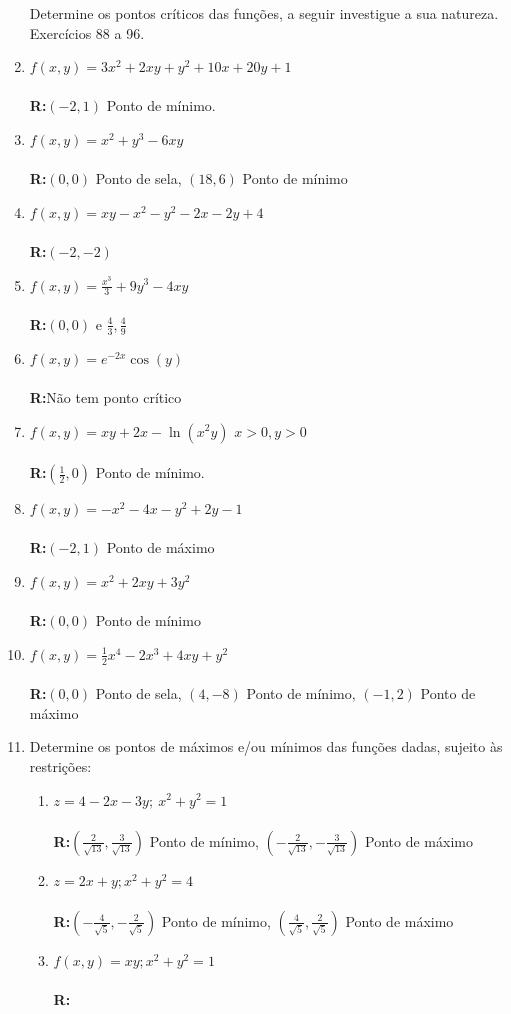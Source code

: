 \documentclass[oneside,a4paper,12pt]{article}
\newcommand{\R}{\\{\bf R:}}
\begin{document}
\begin{enumerate}
    Determine os pontos críticos das funções, a seguir investigue a sua natureza. Exercícios 88 a 96.
            \item $f(x,y) = 3x^2+2xy+y^2+10x+20y+1$ \\\R $(-2,1)$ Ponto de mínimo.
            \item $f(x,y) = x^2+y^3-6xy$ \\\R $(0,0)$ Ponto de sela, $(18,6)$ Ponto de mínimo
            \item $f(x,y) = xy-x^2-y^2-2x-2y+4$ \\\R $(-2,-2)$
            \item $f(x,y) = \displaystyle \frac{x^3}{3}+9y^3-4xy$ \\\R $(0,0)$ e $\displaystyle \frac{4}{3}, \frac{4}{9}$
            \item $f(x,y) = e^{-2x}\cos(y)$ \\\R Não tem ponto crítico
            \item $f(x,y) = xy + 2x - \ln(x^2y)$ $x>0,y>0$\\\R $(\frac{1}{2},0)$ Ponto de mínimo.
            \item $f(x,y) = -x^2-4x-y^2+2y-1$ \\\R $(-2,1)$ Ponto de máximo
            \item $f(x,y) = x^2+2xy+3y^2$ \\\R $(0,0)$ Ponto de mínimo
            \item $f(x,y) = \displaystyle \frac{1}{2}x^4-2x^3+4xy+y^2$ \\\R $(0,0)$ Ponto de sela, $(4,-8)$ Ponto de mínimo, $(-1,2)$ Ponto de máximo
    \item Determine os pontos de máximos e/ou mínimos das funções dadas, sujeito às restrições:
        \begin{enumerate}
            \item $z=4-2x-3y;~x^2+y^2=1$ \\\R $\left(\displaystyle \frac{2}{\sqrt{13}},\frac{3}{\sqrt{13}}\right)$ Ponto de mínimo, $\left(\displaystyle-\frac{2}{\sqrt{13}},-\frac{3}{\sqrt{13}}\right)$ Ponto de máximo
            \item $z=2x+y;x^2+y^2=4$ \\\R $\left(\displaystyle-\frac{4}{\sqrt{5}},-\frac{2}{\sqrt{5}}\right)$ Ponto de mínimo, $\left(\displaystyle\frac{4}{\sqrt{5}},\frac{2}{\sqrt{5}}\right)$ Ponto de máximo
            \item $f(x,y) = xy; x^2+y^2=1$\\\R

\end{enumerate}
\end{enumerate}
\end{document}
